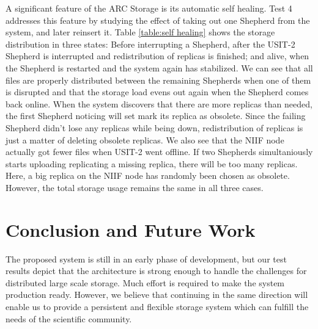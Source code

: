 \documentclass[final]{ieee}
\begin{document}
A significant feature of the ARC Storage is its automatic self
healing. Test 4 addresses this feature by studying the effect of
taking out one Shepherd from the system, and later reinsert it. Table
\ref{table:self healing} shows the storage distribution in three
states: Before interrupting a Shepherd, after the USIT-2
Shepherd is interrupted and redistribution of replicas is finished; and
alive, when the Shepherd is restarted and the system again has stabilized. We
can see that all files are properly distributed between the remaining
Shepherds when one of them is disrupted and that the storage load evens out 
again when the Shepherd comes back online. When the
system discovers that there are more replicas than needed, the first
Shepherd noticing will set mark its replica as obsolete. Since the failing Shepherd didn't lose any replicas while
being down, redistribution of replicas is just a matter of deleting
obsolete replicas. We also see that the NIIF node actually got fewer
files when USIT-2 went offline. If two Shepherds simultaniously
starts uploading replicating a missing replica, there will be too many
replicas. Here, a big replica on the NIIF node has randomly been chosen as
obsolete. However, the total storage usage remains the same in all
three cases.

\section{Conclusion and Future Work}
\label{Conclusion and Future Work}

The proposed system is still in an early phase of development, but our test
results depict that the architecture is strong enough to handle
the challenges for distributed large scale storage. Much
effort is required to make the system production
ready. However, we believe that continuing in the same direction
will enable us to provide a persistent  and flexible storage system
which can fulfill the needs of the scientific community. 
\end{document}
